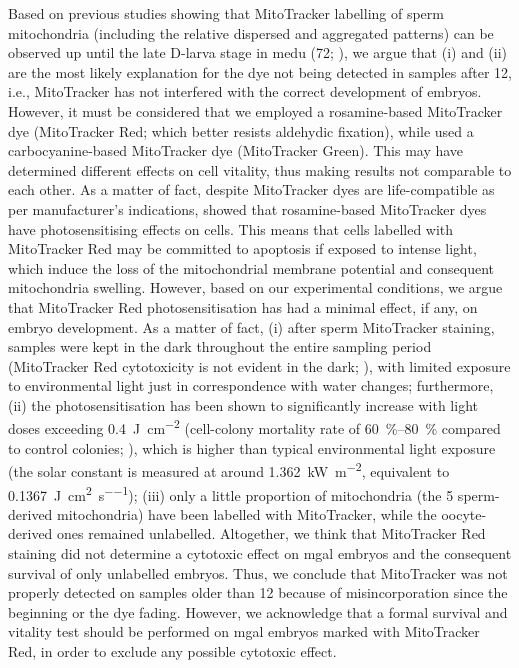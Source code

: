 Based on previous studies showing that MitoTracker labelling of sperm mitochondria (including the relative dispersed and aggregated patterns) can be observed up until the late D-larva stage in \gls{medu} (\qty{72}{\hpf}; ), we argue that (i) and (ii) are the most likely explanation for the dye not being detected in samples after \qty{12}{\hpf}, i.e., MitoTracker has not interfered with the correct development of embryos. However, it must be considered that we employed a rosamine-based MitoTracker dye (MitoTracker Red; which better resists aldehydic fixation), while  used a carbocyanine-based MitoTracker dye (MitoTracker Green). This may have determined different effects on cell vitality, thus making results not comparable to each other. As a matter of fact, despite MitoTracker dyes are life-compatible as per manufacturer's indications,  showed that rosamine-based MitoTracker dyes have photosensitising effects on cells. This means that cells labelled with MitoTracker Red may be committed to apoptosis if exposed to intense light, which induce the loss of the mitochondrial membrane potential and consequent mitochondria swelling. However, based on our experimental conditions, we argue that MitoTracker Red photosensitisation has had a minimal effect, if any, on embryo development. As a matter of fact, (i) after sperm MitoTracker staining, samples were kept in the dark throughout the entire sampling period (MitoTracker Red cytotoxicity is not evident in the dark; ), with limited exposure to environmental light just in correspondence with water changes; furthermore, (ii) the photosensitisation has been shown to significantly increase with light doses exceeding \qty{0.4}{\J\per\square\cm} (cell-colony mortality rate of \qtyrange{60}{80}{\percent} compared to control colonies; ), which is higher than typical environmental light exposure (the solar constant is measured at around \qty{1.362}{\kW\per\square\m}, equivalent to \qty{0.1367}{\J\per\square\cm\per\s}); (iii) only a little proportion of mitochondria (the 5 sperm-derived mitochondria) have been labelled with MitoTracker, while the oocyte-derived ones remained unlabelled. Altogether, we think that MitoTracker Red staining did not determine a cytotoxic effect on \gls{mgal} embryos and the consequent survival of only unlabelled embryos. Thus, we conclude that MitoTracker was not properly detected on samples older than \qty{12}{\hpf} because of misincorporation since the beginning or the dye fading. However, we acknowledge that a formal survival and vitality test should be performed on \gls{mgal} embryos marked with MitoTracker Red, in order to exclude any possible cytotoxic effect.

